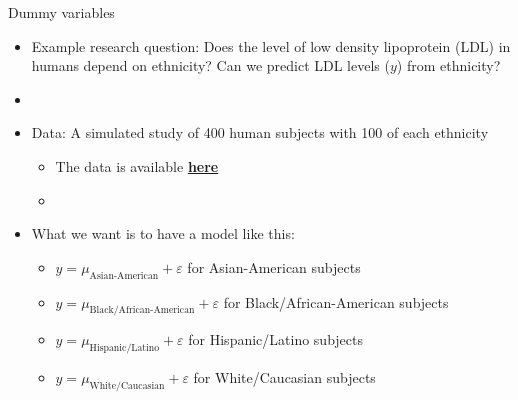 \documentclass[xcolor=dvipsnames]{beamer}
\begin{document}
\begin{frame}{Dummy variables}
	\begin{itemize}
		\item Example research question: Does the level of low density lipoprotein (LDL) in humans depend on ethnicity? Can we predict LDL levels ($y$) from ethnicity?
		\item[]
		\item Data: A simulated study of 400 human subjects with 100 of each ethnicity
		\begin{itemize}
			\item The data is available  \href{https://wordpress.nmsu.edu/ptrainor/2019/11/26/ast-505-materials/}{\textbf{here}} \pause
			\item[]
		\end{itemize}

		\item What we want is to have a model like this: \pause
		\begin{itemize}
			\item $y = \mu_{\text{Asian-American}} + \varepsilon$ for Asian-American subjects \pause
			\item $y = \mu_{\text{Black/African-American}} + \varepsilon$ for Black/African-American subjects \pause
			\item $y = \mu_{\text{Hispanic/Latino}} + \varepsilon$ for Hispanic/Latino subjects \pause
			\item $y = \mu_{\text{White/Caucasian}} + \varepsilon$ for White/Caucasian subjects
		\end{itemize}
	\end{itemize}
\end{frame}
\end{document}
